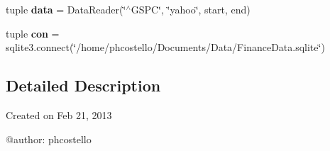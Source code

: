 \begin{DoxyCompactItemize}
\item 
\hypertarget{namespaceDataDownLoader_1_1ImportDataPandas_a555262b6a333c4d13b9ad5bb8181afea}{tuple {\bfseries data} = \-Data\-Reader(\char`\"{}$^\wedge$\-G\-S\-P\-C\char`\"{}, \char`\"{}yahoo\char`\"{}, start, end)}\label{namespaceDataDownLoader_1_1ImportDataPandas_a555262b6a333c4d13b9ad5bb8181afea}

\item 
\hypertarget{namespaceDataDownLoader_1_1ImportDataPandas_aec16fbc08b81881172cb759afbc0b54e}{tuple {\bfseries con} = sqlite3.\-connect(\char`\"{}/home/phcostello/\-Documents/\-Data/\-Finance\-Data.\-sqlite\char`\"{})}\label{namespaceDataDownLoader_1_1ImportDataPandas_aec16fbc08b81881172cb759afbc0b54e}

\end{DoxyCompactItemize}


\subsection{\-Detailed \-Description}
\begin{DoxyVerb}
Created on Feb 21, 2013

@author: phcostello
\end{DoxyVerb}
 

